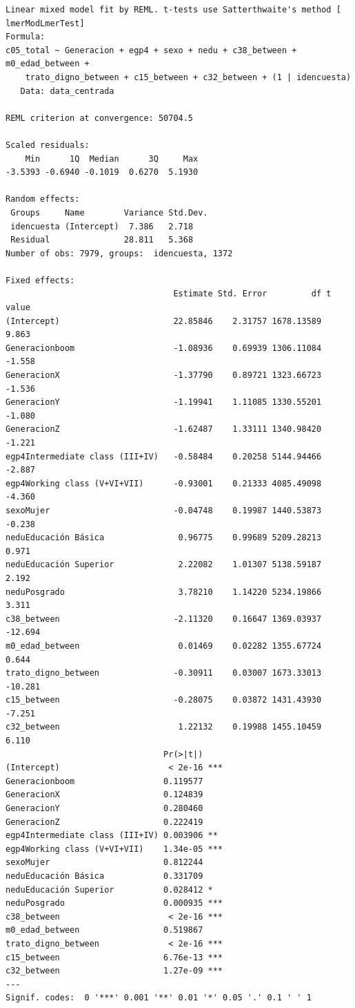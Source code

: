 \documentclass[
  spanish,
  a4paper,
  oneside]{scrbook}
\begin{document}
\begin{verbatim}
Linear mixed model fit by REML. t-tests use Satterthwaite's method [
lmerModLmerTest]
Formula: 
c05_total ~ Generacion + egp4 + sexo + nedu + c38_between + m0_edad_between +  
    trato_digno_between + c15_between + c32_between + (1 | idencuesta)
   Data: data_centrada

REML criterion at convergence: 50704.5

Scaled residuals: 
    Min      1Q  Median      3Q     Max 
-3.5393 -0.6940 -0.1019  0.6270  5.1930 

Random effects:
 Groups     Name        Variance Std.Dev.
 idencuesta (Intercept)  7.386   2.718   
 Residual               28.811   5.368   
Number of obs: 7979, groups:  idencuesta, 1372

Fixed effects:
                                  Estimate Std. Error         df t value
(Intercept)                       22.85846    2.31757 1678.13589   9.863
Generacionboom                    -1.08936    0.69939 1306.11084  -1.558
GeneracionX                       -1.37790    0.89721 1323.66723  -1.536
GeneracionY                       -1.19941    1.11085 1330.55201  -1.080
GeneracionZ                       -1.62487    1.33111 1340.98420  -1.221
egp4Intermediate class (III+IV)   -0.58484    0.20258 5144.94466  -2.887
egp4Working class (V+VI+VII)      -0.93001    0.21333 4085.49098  -4.360
sexoMujer                         -0.04748    0.19987 1440.53873  -0.238
neduEducación Básica               0.96775    0.99689 5209.28213   0.971
neduEducación Superior             2.22082    1.01307 5138.59187   2.192
neduPosgrado                       3.78210    1.14220 5234.19866   3.311
c38_between                       -2.11320    0.16647 1369.03937 -12.694
m0_edad_between                    0.01469    0.02282 1355.67724   0.644
trato_digno_between               -0.30911    0.03007 1673.33013 -10.281
c15_between                       -0.28075    0.03872 1431.43930  -7.251
c32_between                        1.22132    0.19988 1455.10459   6.110
                                Pr(>|t|)    
(Intercept)                      < 2e-16 ***
Generacionboom                  0.119577    
GeneracionX                     0.124839    
GeneracionY                     0.280460    
GeneracionZ                     0.222419    
egp4Intermediate class (III+IV) 0.003906 ** 
egp4Working class (V+VI+VII)    1.34e-05 ***
sexoMujer                       0.812244    
neduEducación Básica            0.331709    
neduEducación Superior          0.028412 *  
neduPosgrado                    0.000935 ***
c38_between                      < 2e-16 ***
m0_edad_between                 0.519867    
trato_digno_between              < 2e-16 ***
c15_between                     6.76e-13 ***
c32_between                     1.27e-09 ***
---
Signif. codes:  0 '***' 0.001 '**' 0.01 '*' 0.05 '.' 0.1 ' ' 1
\end{verbatim}
\end{document}
